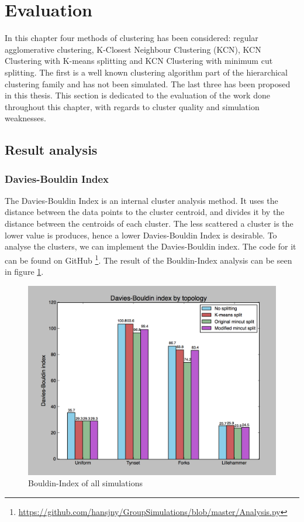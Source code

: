 \section{Evaluation}
In this chapter four methods of clustering has been considered: regular agglomerative clustering, K-Closest Neighbour Clustering (KCN), KCN Clustering with K-means splitting
and KCN Clustering with minimum cut splitting. The first is a well known clustering algorithm part of the hierarchical clustering family and has not been simulated. The
last three has been proposed in this thesis. This section is dedicated to the evaluation of the work done throughout this chapter, with regards to cluster quality and simulation weaknesses.

\subsection{Result analysis}

\subsubsection{Davies-Bouldin Index}
The Davies-Bouldin Index \cite{Bouldin} is an internal cluster analysis method. It uses the distance between the data points to the cluster centroid, and divides
it by the distance between the centroids of each cluster. The less scattered a cluster is the lower value is produces, hence a lower Davies-Bouldin Index is desirable.
To analyse the clusters, we can implement the Davies-Bouldin index. The code for it can be found on GitHub \footnote{\url{https://github.com/hansjny/GroupSimulations/blob/master/Analysis.py}}.
The result of the Bouldin-Index analysis can be seen in figure \ref{fig:bouldin}.
\begin{figure}[h]
	\centering
		\includegraphics[width=14cm]{Images/Bouldin.png}
		\caption{Bouldin-Index of all simulations}%
		\label{fig:bouldin}%
\end{figure}

